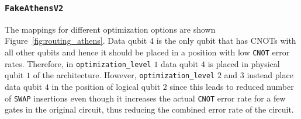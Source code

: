 \documentclass[11pt]{article}
\begin{document}
\subsubsection{\texttt{FakeAthensV2}}
The mappings for different optimization options are shown Figure~\ref{fig:routing_athens}. Data qubit $4$ is the only qubit that has CNOTs with all other qubits and hence it should be placed in a position with low \texttt{CNOT} error rates. Therefore, in \texttt{optimization\_level} $1$ data qubit $4$ is placed in physical qubit $1$ of the architecture. However, \texttt{optimization\_level} $2$ and $3$ instead place data qubit $4$ in the position of logical qubit $2$ since this leads to reduced number of \texttt{SWAP} insertions even though it increases the actual \texttt{CNOT} error rate for a few gates in the original circuit, thus reducing the combined error rate of the circuit.
\end{document}
